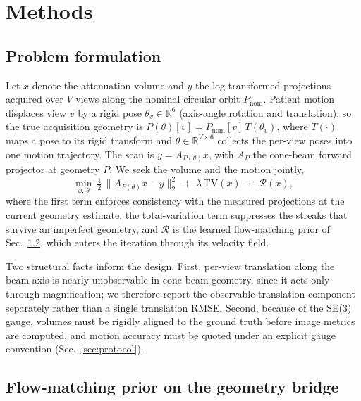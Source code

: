 \documentclass[11pt]{article}
\newcommand{\Pnom}{P_{\mathrm{nom}}}
\begin{document}
\section{Methods}
\label{sec:method}

\subsection{Problem formulation}
\label{sec:forward}

Let $x$ denote the attenuation volume and $y$ the log-transformed projections acquired over
$V$ views along the nominal circular orbit $\Pnom$. Patient motion displaces view $v$ by a
rigid pose $\theta_v \in \mathbb{R}^6$ (axis-angle rotation and translation), so the true
acquisition geometry is $P(\theta)[v] = \Pnom[v]\,T(\theta_v)$, where $T(\cdot)$ maps a pose
to its rigid transform and $\theta \in \mathbb{R}^{V\times 6}$ collects the per-view poses
into one motion trajectory. The scan is $y = A_{P(\theta)}x$, with $A_P$ the cone-beam forward
projector at geometry $P$. We seek the volume and the motion jointly,
\begin{equation}
\min_{x,\,\theta}\ \tfrac12\,\|A_{P(\theta)}x - y\|_2^2 \;+\; \lambda\,\mathrm{TV}(x)
\;+\; \mathcal{R}(x),
\label{eq:objective}
\end{equation}
where the first term enforces consistency with the measured projections at the current
geometry estimate, the total-variation term suppresses the streaks that survive an imperfect
geometry, and $\mathcal{R}$ is the learned flow-matching prior of Sec.~\ref{sec:bridge},
which enters the iteration through its velocity field.

Two structural facts inform the design. First, per-view translation along the beam axis is
nearly unobservable in cone-beam geometry, since it acts only through magnification; we
therefore report the observable translation component separately rather than a single
translation RMSE. Second, because of the SE(3) gauge, volumes must be rigidly aligned to the
ground truth before image metrics are computed, and motion accuracy must be quoted under an
explicit gauge convention (Sec.~\ref{sec:protocol}).

\subsection{Flow-matching prior on the geometry bridge}
\label{sec:bridge}
\end{document}
